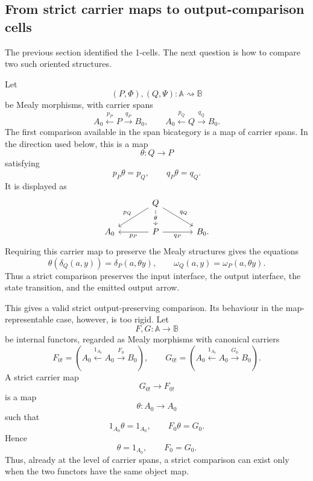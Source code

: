 \subsection{From strict carrier maps to output-comparison cells}
\label{subsec:strict-comparisons-output-comparisons}

The previous section identified the 1-cells. The next question is how to compare two such oriented structures.

Let
\[
    (P,\Phi),(Q,\Psi):\mathbb A\rightsquigarrow\mathbb B
\]
be Mealy morphisms, with carrier spans
\[
    A_0\xleftarrow{p_P}P\xrightarrow{q_P}B_0,
    \qquad
    A_0\xleftarrow{p_Q}Q\xrightarrow{q_Q}B_0.
\]
The first comparison available in the span bicategory is a map of carrier spans. In the direction used below, this is a map
\[
    \theta:Q\to P
\]
satisfying
\[
    p_P\theta=p_Q,
    \qquad
    q_P\theta=q_Q.
\]
It is displayed as
\[
    \begin{tikzcd}[column sep=large]
        &
            Q
                \arrow[d, "\theta" description]
                \arrow[dl, "p_Q"']
                \arrow[dr, "q_Q"]
        &
        \\
            A_0
        &
            P
                \arrow[l, "p_P"]
                \arrow[r, "q_P"']
        &
            B_0.
    \end{tikzcd}
\]
Requiring this carrier map to preserve the Mealy structures gives the equations
\[
    \theta(\delta_Q(a,y))
    =
    \delta_P(a,\theta y),
    \qquad
    \omega_Q(a,y)
    =
    \omega_P(a,\theta y).
\]
Thus a strict comparison preserves the input interface, the output interface, the state transition, and the emitted output arrow.

This gives a valid strict output-preserving comparison. Its behaviour in the map-representable case, however, is too rigid. Let
\[
    F,G:\mathbb A\to\mathbb B
\]
be internal functors, regarded as Mealy morphisms with canonical carriers
\[
    F_{0!}
    =
    \left(
        A_0
        \xleftarrow{1_{A_0}}
        A_0
        \xrightarrow{F_0}
        B_0
    \right),
    \qquad
    G_{0!}
    =
    \left(
        A_0
        \xleftarrow{1_{A_0}}
        A_0
        \xrightarrow{G_0}
        B_0
    \right).
\]
A strict carrier map
\[
    G_{0!}\to F_{0!}
\]
is a map
\[
    \theta:A_0\to A_0
\]
such that
\[
    1_{A_0}\theta=1_{A_0},
    \qquad
    F_0\theta=G_0.
\]
Hence
\[
    \theta=1_{A_0},
    \qquad
    F_0=G_0.
\]
Thus, already at the level of carrier spans, a strict comparison can exist
only when the two functors have the same object map.

